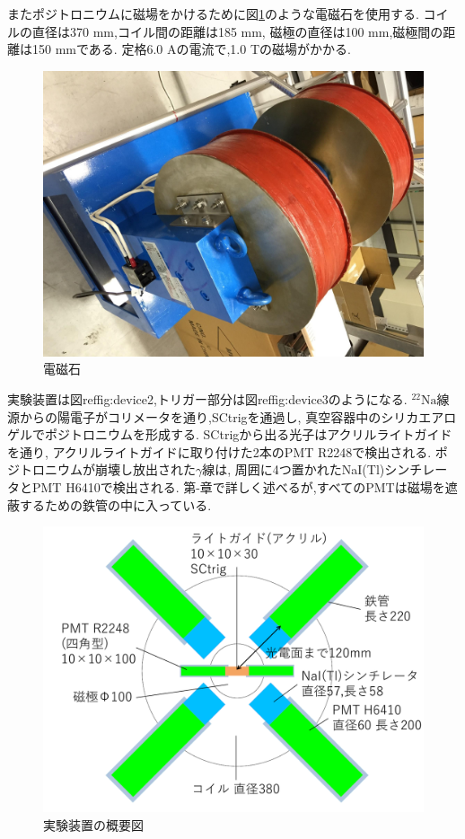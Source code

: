 またポジトロニウムに磁場をかけるために図\ref{fig:mag}のような電磁石を使用する.
コイルの直径は370 mm,コイル間の距離は185 mm,
磁極の直径は100 mm,磁極間の距離は150 mmである.
定格6.0 Aの電流で,1.0 Tの磁場がかかる.

\begin{figure}[H]
\centering
\includegraphics[keepaspectratio,angle=90,scale=0.4]{fig/ybm/mag.pdf}
\caption{電磁石}
\label{fig:mag}
\end{figure}

実験装置は図ref{fig:device2},トリガー部分は図ref{fig:device3}のようになる.
$\mathrm{^{22}Na}$線源からの陽電子がコリメータを通り,SCtrigを通過し,
真空容器中のシリカエアロゲルでポジトロニウムを形成する.
SCtrigから出る光子はアクリルライトガイドを通り,
アクリルライトガイドに取り付けた2本のPMT R2248で検出される.
ポジトロニウムが崩壊し放出された$\gamma$線は,
周囲に4つ置かれたNaI(Tl)シンチレータとPMT H6410で検出される.
第-章で詳しく述べるが,すべてのPMTは磁場を遮蔽するための鉄管の中に入っている.

\begin{figure}[H]
\centering
\includegraphics[keepaspectratio,scale=0.4]{fig/ybm/device2.pdf}
\caption{実験装置の概要図}
\label{fig:device2}
\end{figure}

